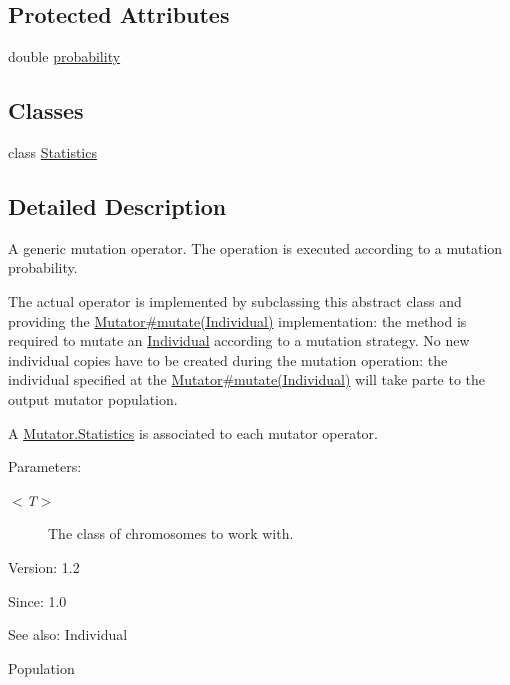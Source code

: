 \subsection*{Protected Attributes}
\begin{CompactItemize}
\item 
double \hyperlink{classjenes_1_1stage_1_1operator_1_1_mutator_3_01_t_01extends_01_chromosome_01_4_60f38eb7afd1ad6a7d1c0c639df2d5fe}{probability}
\end{CompactItemize}
\subsection*{Classes}
\begin{CompactItemize}
\item 
class \hyperlink{classjenes_1_1stage_1_1operator_1_1_mutator_3_01_t_01extends_01_chromosome_01_4_1_1_statistics}{Statistics}
\end{CompactItemize}


\subsection{Detailed Description}
A generic mutation operator. The operation is executed according to a mutation probability. 

The actual operator is implemented by subclassing this abstract class and providing the \hyperlink{}{Mutator\#mutate(Individual)} implementation: the method is required to mutate an \hyperlink{}{Individual} according to a mutation strategy. No new individual copies have to be created during the mutation operation: the individual specified at the \hyperlink{}{Mutator\#mutate(Individual)} will take parte to the output mutator population. 

A \hyperlink{}{Mutator.Statistics} is associated to each mutator operator.

\begin{Desc}
\item[Parameters:]
\begin{description}
\item[{\em $<$T$>$}]The class of chromosomes to work with.\end{description}
\end{Desc}
\begin{Desc}
\item[Version:]1.2 \end{Desc}
\begin{Desc}
\item[Since:]1.0\end{Desc}
\begin{Desc}
\item[See also:]Individual 

Population \end{Desc}


